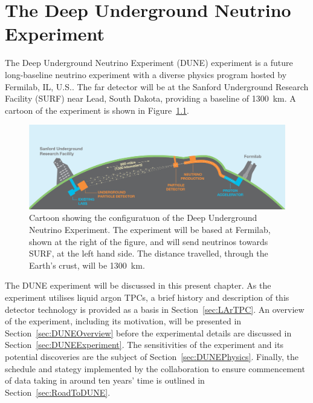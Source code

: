 
\graphicspath{{DUNE/Figs/}}

\chapter{The Deep Underground Neutrino Experiment}\label{chap:DUNE}

The Deep Underground Neutrino Experiment (DUNE) experiment \cite{DUNECDR1,DUNECDR2,DUNECDR3,DUNECDR4} is a future long-baseline neutrino experiment with a diverse physics program hosted by Fermilab, IL, U.S..  The far detector will be at the Sanford Underground Research Facility (SURF) near Lead, South Dakota, providing a baseline of 1300~km.  A cartoon of the experiment is shown in Figure~\ref{fig:DUNE}.

\begin{figure}
  \centering
  \includegraphics[width=14cm]{DUNE.jpg}
  \caption[Cartoon showing the configuration of the Deep Underground Neutrino Experiment.]{Cartoon showing the configuratuon of the Deep Underground Neutrino Experiment.  The experiment will be based at Fermilab, shown at the right of the figure, and will send neutrinos towards SURF, at the left hand side.  The distance travelled, through the Earth's crust, will be 1300~km.}
  \label{fig:DUNE}
\end{figure}

The DUNE experiment will be discussed in this present chapter.  As the experiment utilises liquid argon TPCs, a brief history and description of this detector technology is provided as a basis in Section~\ref{sec:LArTPC}.  An overview of the experiment, including its motivation, will be presented in Section~\ref{sec:DUNEOverview} before the experimental details are discussed in Section~\ref{sec:DUNEExperiment}.  The sensitivities of the experiment and its potential discoveries are the subject of Section~\ref{sec:DUNEPhysics}.  Finally, the schedule and stategy implemented by the collaboration to ensure commencement of data taking in around ten years' time is outlined in Section~\ref{sec:RoadToDUNE}.

